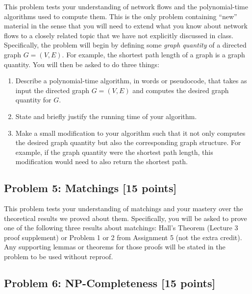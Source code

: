 \documentclass[10pt]{article}
\begin{document}
This problem tests your understanding of network flows and the polynomial-time algorithms used to compute them.
This is the only problem containing ``new'' material in the sense that you will need to extend what you know about network flows to a closely related topic that we have not explicitly discussed in class.
Specifically, the problem will begin by defining some \textit{graph quantity} of a directed graph $G = (V, E)$.
For example, the shortest path length of a graph is a graph quantity.
You will then be asked to do three things:
\begin{enumerate}[label=(\alph*)]
\item Describe a polynomial-time algorithm, in words or pseudocode, that takes as input the directed graph $G = (V, E)$ and computes the desired graph quantity for $G$.

\item State and briefly justify the running time of your algorithm.

\item Make a small modification to your algorithm such that it not only computes the desired graph quantity but also the corresponding graph structure.
For example, if the graph quantity were the shortest path length, this modification would need to also return the shortest path.
\end{enumerate}

\subsection{Problem 5: Matchings [15 points]}

This problem tests your understanding of matchings and your mastery over the theoretical results we proved about them.
Specifically, you will be asked to prove one of the following three results about matchings: Hall's Theorem (Lecture 3 proof supplement) or Problem 1 or 2 from Assignment 5 (not the extra credit).
Any supporting lemmas or theorems for those proofs will be stated in the problem to be used without reproof.

\subsection{Problem 6: NP-Completeness [15 points]}
\end{document}
